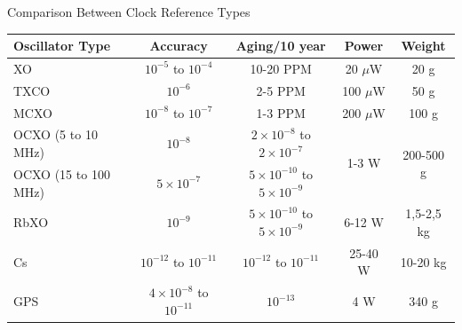 \begin{frame}{Comparison Between Clock Reference Types}

    \begin{table}[!ht]\tiny
        \centering
        \begin{tabular}{lcccc}
            \toprule[1.5pt]
            \textbf{Oscillator Type} & \textbf{Accuracy} & \textbf{Aging/10 year} & \textbf{Power} & \textbf{Weight} \\
            \midrule
            XO                   & $10^{-5}$ to $10^{-4}$   & 10-20 PPM                                 & 20 $\mu$W  & 20 g \\
            TXCO                 & $10^{-6}$                & 2-5 PPM                                   & 100 $\mu$W & 50 g \\
            MCXO                 & $10^{-8}$ to $10^{-7}$   & 1-3 PPM                                   & 200 $\mu$W & 100 g \\
            OCXO (5 to 10 MHz)   & $10^{-8}$                & $2 \times 10^{-8}$ to $2 \times 10^{-7}$  & \multirow{2}{*}{1-3 W} & \multirow{2}{*}{200-500 g} \\
            OCXO (15 to 100 MHz) & $5 \times 10^{-7}$       & $5 \times 10^{-10}$ to $5 \times 10^{-9}$ &            &  \\
            RbXO                 & $10^{-9}$                & $5 \times 10^{-10}$ to $5 \times 10^{-9}$ & 6-12 W & 1,5-2,5 kg \\
            Cs                   & $10^{-12}$ to $10^{-11}$ & $10^{-12}$ to $10^{-11}$                  & 25-40 W & 10-20 kg \\
            GPS                  & $4 \times 10^{-8}$ to $10^{-11}$ & $10^{-13}$ & 4 W & 340 g \\
            \bottomrule[1.5pt]
        \end{tabular}
        \label{tab:osc-comp}
    \end{table}

\end{frame}

